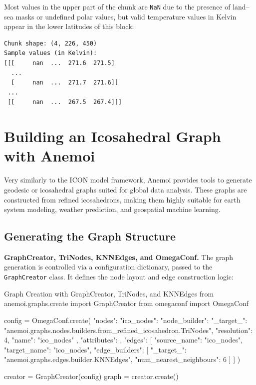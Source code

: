 Most values in the upper part of the chunk are \texttt{NaN} due to the presence of land–sea masks or undefined polar values, but valid temperature values in Kelvin appear in the lower latitudes of this block:

\begin{verbatim}
Chunk shape: (4, 226, 450)
Sample values (in Kelvin):
[[[     nan  ...  271.6  271.5]
  ...
  [     nan  ...  271.7  271.6]]
 ...
 [[     nan  ...  267.5  267.4]]]
\end{verbatim}


%
\section{Building an Icosahedral Graph with Anemoi}

Very similarly to the ICON model framework, Anemoi provides tools to generate geodesic or icosahedral graphs suited for global data analysis. These graphs are constructed from refined icosahedrons, making them highly suitable for earth system modeling, weather prediction, and geospatial machine learning.

%
\subsection{Generating the Graph Structure}

{\bf GraphCreator, TriNodes, KNNEdges, and OmegaConf.}
The graph generation is controlled via a configuration dictionary, passed to the \texttt{GraphCreator} class. It defines the node layout and edge construction logic:

\begin{codeonly}{Graph Creation with GraphCreator, TriNodes, and KNNEdges}
from anemoi.graphs.create import GraphCreator
from omegaconf import OmegaConf

config = OmegaConf.create({
    "nodes": {
        "ico_nodes": {
            "node_builder": {
                "_target_": "anemoi.graphs.nodes.builders.from_refined_icosahedron.TriNodes",
                "resolution": 4,
                "name": "ico_nodes"
            },
            "attributes": {}
        }
    },
    "edges": [
        {
            "source_name": "ico_nodes",
            "target_name": "ico_nodes",
            "edge_builders": [
                {
                    "_target_": "anemoi.graphs.edges.builder.KNNEdges",
                    "num_nearest_neighbours": 6
                }
            ]
        }
    ]
})

creator = GraphCreator(config)
graph = creator.create()
\end{codeonly}

